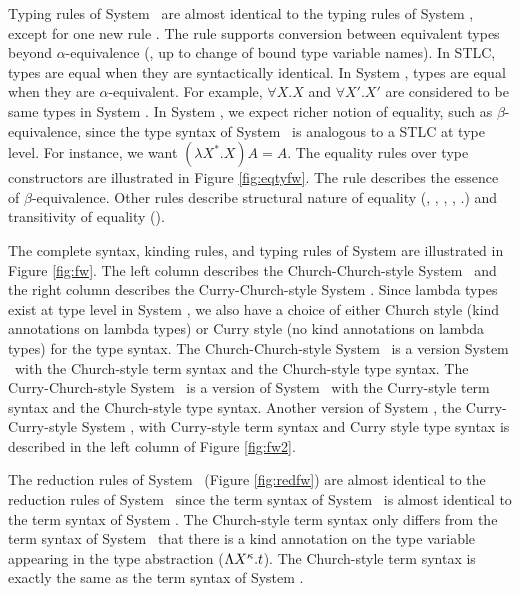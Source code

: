 Typing rules of System \Fw\ are almost identical to the typing rules of
System \F, except for one new rule . The  rule
supports conversion between equivalent types beyond $\alpha$-equivalence
(\ie, up to change of bound type variable names).
In STLC, types are equal when they are syntactically identical.
In System \F, types are equal when they are $\alpha$-equivalent. For example,
$\forall X.X$ and $\forall X'.X'$ are considered to be same types in System \F.
In System \Fw, we expect richer notion of equality, such as $\beta$-equivalence,
since the type syntax of System \Fw\ is analogous to a STLC at type level.
For instance, we want $(\lambda X^{*}.X) A = A$. The equality rules over
type constructors are illustrated in Figure \ref{fig:eqtyfw}.
The  rule describes the essence of $\beta$-equivalence.
Other rules describe structural nature of equality (,
, , , .)
and transitivity of equality ().


The complete syntax, kinding rules, and typing rules of System \Fw
are illustrated in Figure \ref{fig:fw}. The left column describes
the Church-Church-style System \F\ and the right column describes
the Curry-Church-style System \F. Since lambda types exist at type level
in System \Fw, we also have a choice of either Church style (kind annotations
on lambda types) or Curry style (no kind annotations on lambda types) for
the type syntax. The Church-Church-style System \Fw\ is a version System \Fw\ 
with the Church-style term syntax and the Church-style type syntax.
The Curry-Church-style System \Fw\ is a version of System \Fw\ 
with the Curry-style term syntax and the Church-style type syntax.
Another version of System \Fw, the Curry-Curry-style System \Fw,
with Curry-style term syntax and Curry style type syntax is described
in the left column of Figure \ref{fig:fw2}.

The reduction rules of System \Fw\ (Figure \ref{fig:redfw}) are
almost identical to the reduction rules of System \F\ since the term syntax of
System \Fw\ is almost identical to the term syntax of System \F.
The Church-style term syntax only differs from the term syntax of System \F\ 
that there is a kind annotation on the type variable appearing in
the type abstraction ($\Lambda X^\kappa.t$). The Church-style term syntax is
exactly the same as the term syntax of System \F.

